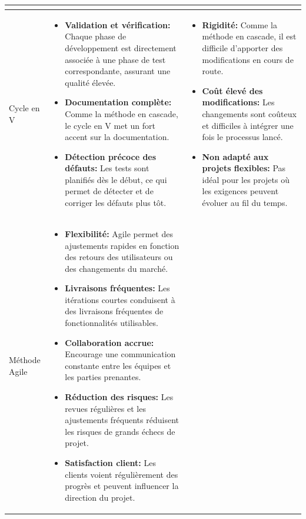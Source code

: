 \documentclass[12pt]{report}
\begin{document}
\begin{longtable}{|p{3cm}|p{5.5cm}|p{5.5cm}|}
\begin{itemize}
						\end{itemize}\\
						\hline 
						Cycle en V &
						\begin{itemize}
							\item \textbf{Validation et vérification:} Chaque phase de développement est directement associée à une phase de test correspondante, assurant une qualité élevée.
							\item \textbf{Documentation complète:} Comme la méthode en cascade, le cycle en V met un fort accent sur la documentation.
							\item \textbf{Détection précoce des défauts:} Les tests sont planifiés dès le début, ce qui permet de détecter et de corriger les défauts plus tôt.
						\end{itemize} &
						\begin{itemize}
							\item \textbf{Rigidité:} Comme la méthode en cascade, il est difficile d'apporter des modifications en cours de route.
							\item \textbf{Coût élevé des modifications:} Les changements sont coûteux et difficiles à intégrer une fois le processus lancé.
							\item \textbf{Non adapté aux projets flexibles:} Pas idéal pour les projets où les exigences peuvent évoluer au fil du temps.
						\end{itemize}\\
						\hline 
						Méthode Agile &
						\begin{itemize}
							\item \textbf{Flexibilité:} Agile permet des ajustements rapides en fonction des retours des utilisateurs ou des changements du marché.
							\item \textbf{Livraisons fréquentes:} Les itérations courtes conduisent à des livraisons fréquentes de fonctionnalités utilisables.
							\item \textbf{Collaboration accrue:} Encourage une communication constante entre les équipes et les parties prenantes.
							\item \textbf{Réduction des risques:} Les revues régulières et les ajustements fréquents réduisent les risques de grands échecs de projet.
							\item \textbf{Satisfaction client:} Les clients voient régulièrement des progrès et peuvent influencer la direction du projet.
						\end{itemize} &
						\begin{itemize}

\end{itemize}
\end{longtable}
\end{document}
